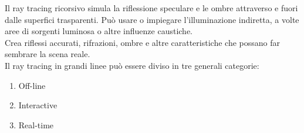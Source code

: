 \documentclass[9pt,a4paper,twoside]{tau}
\begin{document}
Il ray tracing ricorsivo simula la riflessione speculare e le ombre attraverso e fuori dalle superfici trasparenti. Può usare o impiegare l'illuminazione indiretta, a volte aree di sorgenti luminosa o altre influenze caustiche.\\
Crea riflessi accurati, rifrazioni, ombre e altre caratteristiche che possano far sembrare la scena reale.\\
Il ray tracing in grandi linee può essere diviso in tre generali categorie:
\begin{enumerate}
	\item Off-line
	\item Interactive
	\item Real-time
\end{enumerate}

\end{document}
